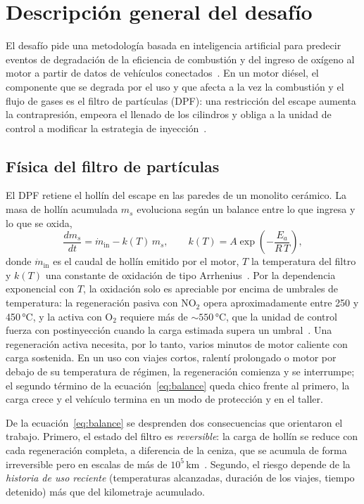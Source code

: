 \section{Descripción general del desafío}
\label{sec:desafio}

El desafío pide una metodología basada en inteligencia artificial para predecir eventos de degradación de la eficiencia de
combustión y del ingreso de oxígeno al motor a partir de datos de vehículos conectados~\cite{ford}. En un motor diésel, el
componente que se degrada por el uso y que afecta a la vez la combustión y el flujo de gases es el filtro de partículas
(DPF): una restricción del escape aumenta la contrapresión, empeora el llenado de los cilindros y obliga a la unidad de
control a modificar la estrategia de inyección~\cite{guan2015}.

\subsection{Física del filtro de partículas}
\label{sec:fisica}

El DPF retiene el hollín del escape en las paredes de un monolito cerámico. La masa de hollín acumulada $m_s$ evoluciona
según un balance entre lo que ingresa y lo que se oxida,
\begin{equation}
  \frac{dm_s}{dt} = \dot m_{\mathrm{in}} - k(T)\, m_s, \qquad k(T) = A \exp\!\left(-\frac{E_a}{R\,T}\right),
  \label{eq:balance}
\end{equation}
donde $\dot m_{\mathrm{in}}$ es el caudal de hollín emitido por el motor, $T$ la temperatura del filtro y $k(T)$ una
constante de oxidación de tipo Arrhenius~\cite{guan2015}. Por la dependencia exponencial con $T$, la oxidación solo es
apreciable por encima de umbrales de temperatura: la regeneración pasiva con $\mathrm{NO_2}$ opera aproximadamente entre
250 y 450\,°C, y la activa con $\mathrm{O_2}$ requiere más de $\sim 550$\,°C, que la unidad de control fuerza con
postinyección cuando la carga estimada supera un umbral~\cite{guan2015}. Una regeneración activa necesita, por lo tanto,
varios minutos de motor caliente con carga sostenida. En un uso con viajes cortos, ralentí prolongado o motor por debajo de
su temperatura de régimen, la regeneración comienza y se interrumpe; el segundo término de la ecuación~\eqref{eq:balance}
queda chico frente al primero, la carga crece y el vehículo termina en un modo de protección y en el taller.

De la ecuación~\eqref{eq:balance} se desprenden dos consecuencias que orientaron el trabajo. Primero, el estado del filtro es
\emph{reversible}: la carga de hollín se reduce con cada regeneración completa, a diferencia de la ceniza, que se acumula de
forma irreversible pero en escalas de más de $10^5$\,km~\cite{guan2015}. Segundo, el riesgo depende de la \emph{historia de
uso reciente} (temperaturas alcanzadas, duración de los viajes, tiempo detenido) más que del kilometraje acumulado.

